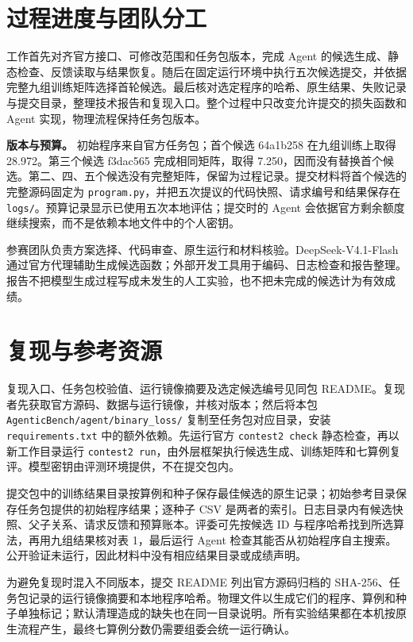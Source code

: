 \documentclass[UTF8,a4paper,11pt]{ctexart}
\begin{document}
\section{过程进度与团队分工}
工作首先对齐官方接口、可修改范围和任务包版本，完成 Agent 的候选生成、静态检查、反馈读取与结果恢复。随后在固定运行环境中执行五次候选提交，并依据完整九组训练矩阵选择首轮候选。最后核对选定程序的哈希、原生结果、失败记录与提交目录，整理技术报告和复现入口。整个过程中只改变允许提交的损失函数和 Agent 实现，物理流程保持任务包版本。

\textbf{版本与预算。} 初始程序来自官方任务包；首个候选 64a1b258 在九组训练上取得 28.972。第三个候选 f3dac565 完成相同矩阵，取得 7.250，因而没有替换首个候选。第二、四、五个候选没有完整矩阵，保留为过程记录。提交材料将首个候选的完整源码固定为 \texttt{program.py}，并把五次提议的代码快照、请求编号和结果保存在 \texttt{logs/}。预算记录显示已使用五次本地评估；提交时的 Agent 会依据官方剩余额度继续搜索，而不是依赖本地文件中的个人密钥。

参赛团队负责方案选择、代码审查、原生运行和材料核验。DeepSeek-V4.1-Flash 通过官方代理辅助生成候选函数；外部开发工具用于编码、日志检查和报告整理。报告不把模型生成过程写成未发生的人工实验，也不把未完成的候选计为有效成绩。

\section{复现与参考资源}
复现入口、任务包校验值、运行镜像摘要及选定候选编号见同包 README。复现者先获取官方源码、数据与运行镜像，并核对版本；然后将本包 \texttt{AgenticBench/agent/binary\_loss/} 复制至任务包对应目录，安装 \texttt{requirements.txt} 中的额外依赖。先运行官方 \texttt{contest2 check} 静态检查，再以新工作目录运行 \texttt{contest2 run}，由外层框架执行候选生成、训练矩阵和七算例复评。模型密钥由评测环境提供，不在提交包内。

提交包中的训练结果目录按算例和种子保存最佳候选的原生记录；初始参考目录保存任务包提供的初始程序结果；逐种子 CSV 是两者的索引。日志目录内有候选快照、父子关系、请求反馈和预算账本。评委可先按候选 ID 与程序哈希找到所选算法，再用九组结果核对表 1，最后运行 Agent 检查其能否从初始程序自主搜索。公开验证未运行，因此材料中没有相应结果目录或成绩声明。

为避免复现时混入不同版本，提交 README 列出官方源码归档的 SHA-256、任务包记录的运行镜像摘要和本地程序哈希。物理文件以生成它们的程序、算例和种子单独标记；默认清理造成的缺失也在同一目录说明。所有实验结果都在本机按原生流程产生，最终七算例分数仍需要组委会统一运行确认。
\end{document}
